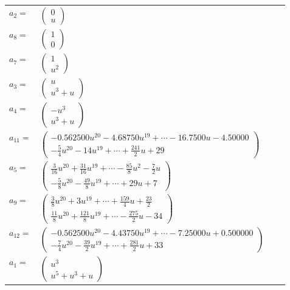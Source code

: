 \documentclass[1p]{elsarticle_modified}
\theoremstyle{definition}
\begin{document}
\begin{tabular}{m{7pt} m{180pt} m{7pt} m{180pt} }
\flushright $a_{2}=$&$\begin{pmatrix}0\\u\end{pmatrix}$ \\
\flushright $a_{8}=$&$\begin{pmatrix}1\\0\end{pmatrix}$ \\
\flushright $a_{7}=$&$\begin{pmatrix}1\\u^2\end{pmatrix}$ \\
\flushright $a_{3}=$&$\begin{pmatrix}u\\u^3+u\end{pmatrix}$ \\
\flushright $a_{4}=$&$\begin{pmatrix}- u^3\\u^3+u\end{pmatrix}$ \\
\flushright $a_{11}=$&$\begin{pmatrix}-0.562500 u^{20}-4.68750 u^{19}+\cdots-16.7500 u-4.50000\\-\frac{5}{4} u^{20}-14 u^{19}+\cdots+\frac{241}{2} u+29\end{pmatrix}$ \\
\flushright $a_{5}=$&$\begin{pmatrix}\frac{3}{16} u^{20}+\frac{31}{16} u^{19}+\cdots-\frac{85}{8} u^2-\frac{7}{2} u\\-\frac{5}{8} u^{20}-\frac{49}{8} u^{19}+\cdots+29 u+7\end{pmatrix}$ \\
\flushright $a_{9}=$&$\begin{pmatrix}\frac{3}{8} u^{20}+3 u^{19}+\cdots+\frac{159}{4} u+\frac{23}{2}\\\frac{11}{8} u^{20}+\frac{121}{8} u^{19}+\cdots-\frac{275}{2} u-34\end{pmatrix}$ \\
\flushright $a_{12}=$&$\begin{pmatrix}-0.562500 u^{20}-4.43750 u^{19}+\cdots-7.25000 u+0.500000\\-\frac{7}{4} u^{20}-\frac{39}{2} u^{19}+\cdots+\frac{281}{2} u+33\end{pmatrix}$ \\
\flushright $a_{1}=$&$\begin{pmatrix}u^3\\u^5+u^3+u\end{pmatrix}$ \\

\end{tabular}
\end{document}
